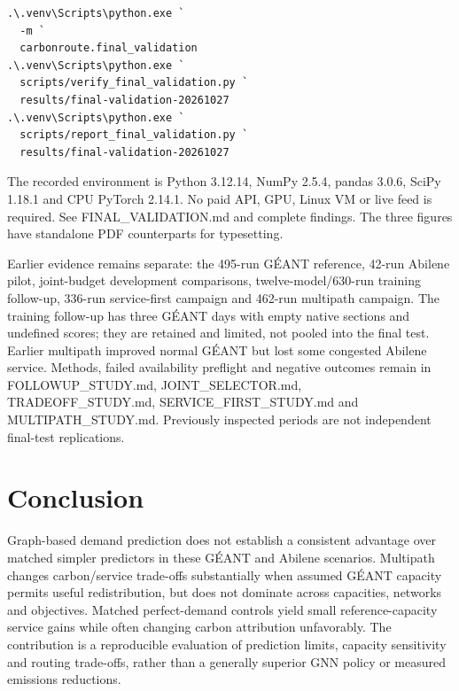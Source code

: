 \documentclass[conference,letterpaper]{IEEEtran}
\begin{document}
{\footnotesize
\begin{verbatim}
.\.venv\Scripts\python.exe `
  -m `
  carbonroute.final_validation
.\.venv\Scripts\python.exe `
  scripts/verify_final_validation.py `
  results/final-validation-20261027
.\.venv\Scripts\python.exe `
  scripts/report_final_validation.py `
  results/final-validation-20261027
\end{verbatim}
}

The recorded environment is Python 3.12.14, NumPy 2.5.4, pandas 3.0.6, SciPy 1.18.1 and CPU PyTorch 2.14.1. No paid API, GPU, Linux VM or live feed is required. See FINAL\_VALIDATION.md and complete findings. The three figures have standalone PDF counterparts for typesetting.

Earlier evidence remains separate: the 495-run GÉANT reference, 42-run Abilene pilot, joint-budget development comparisons, twelve-model/630-run training follow-up, 336-run service-first campaign and 462-run multipath campaign. The training follow-up has three GÉANT days with empty native sections and undefined scores; they are retained and limited, not pooled into the final test. Earlier multipath improved normal GÉANT but lost some congested Abilene service. Methods, failed availability preflight and negative outcomes remain in FOLLOWUP\_STUDY.md, JOINT\_SELECTOR.md, TRADEOFF\_STUDY.md, SERVICE\_FIRST\_STUDY.md and MULTIPATH\_STUDY.md. Previously inspected periods are not independent final-test replications.

\section{Conclusion}

Graph-based demand prediction does not establish a consistent advantage over matched simpler predictors in these GÉANT and Abilene scenarios. Multipath changes carbon/service trade-offs substantially when assumed GÉANT capacity permits useful redistribution, but does not dominate across capacities, networks and objectives. Matched perfect-demand controls yield small reference-capacity service gains while often changing carbon attribution unfavorably. The contribution is a reproducible evaluation of prediction limits, capacity sensitivity and routing trade-offs, rather than a generally superior GNN policy or measured emissions reductions.



\end{document}
